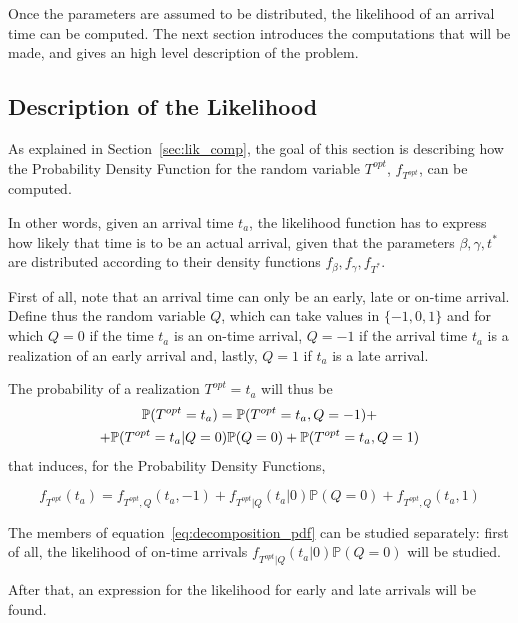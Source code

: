 Once the parameters are assumed to be distributed,
the likelihood of an arrival time can be computed.
The next section introduces the computations that will be made,
and gives an high level description of the problem.

\subsection{Description of the Likelihood}
\label{sec:descr-likel}

As explained in Section~\ref{sec:lik_comp},
the goal of this section is describing how the Probability Density Function for the random variable \(T^{opt}\), \(f_{T^{opt}}\), can be computed.

In other words, given an arrival time \(t_a\),
the likelihood function has to express how likely that time is to be an actual arrival,
given that the parameters \(\beta, \gamma, t^*\) are distributed according to their density functions \(f_\beta, f_\gamma, f_{T^*}\).

First of all, note that an arrival time can only be an early, late or on-time arrival.
Define thus the random variable \(Q\),
which can take values in \(\{-1, 0, 1\}\) and for which
\(Q = 0\) if the time \(t_a\) is an on-time arrival,
\(Q = -1\) if the arrival time \(t_a\) is a realization of an early arrival and, lastly,
\(Q = 1\) if \(t_a\) is a late arrival.

The probability of a realization \(T^{opt} = t_a\) will thus be
\begin{multline}
  \label{eq:decomposition_prob}
  \mathbb{P}(T^{opt} = t_a) = \mathbb{P}(T^{opt} = t_a, Q = -1) + \\
  + \mathbb{P}(T^{opt} = t_a | Q = 0)\mathbb{P}(Q = 0)
  + \mathbb{P}(T^{opt} = t_a, Q = 1)
\end{multline}
that induces, for the Probability Density Functions,

\begin{equation}
  \label{eq:decomposition_pdf}
  f_{T^{opt}}(t_a) = f_{T^{opt}, Q}(t_a, -1)
  + f_{T^{opt} | Q}(t_a | 0)\mathbb{P}(Q = 0) + f_{T^{opt}, Q}(t_a, 1)
\end{equation}

The members of equation~\eqref{eq:decomposition_pdf} can be studied separately:
first of all,
the likelihood of on-time arrivals \(f_{T^{opt} | Q}(t_a | 0)\mathbb{P}(Q = 0)\) will be studied.

After that, an expression for the likelihood for early and late arrivals will be found.

